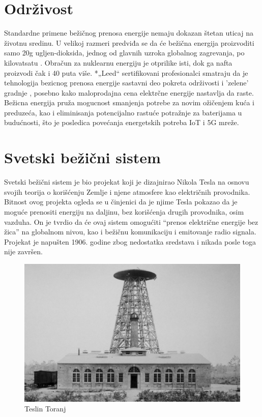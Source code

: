 \documentclass[a4paper]{article}
\begin{document}
\section{Održivost}
\label{sec:Održivost}

Standardne primene bežičnog prenosa energije nemaju dokazan štetan uticaj na životnu sredinu. U velikoj razmeri predviđa se da će bežična energija proizvoditi samo 20g ugljen-dioksida, jednog od glavnih uzroka globalnog zagrevanja, po kilovatsatu \cite{a}. Obračun za nuklearnu energiju je otprilike isti, dok ga nafta proizvodi čak i 40 puta više. *„Leed“ sertifikovani profesionalci smatraju da je tehnologija bezicnog prenosa energije sastavni deo pokreta održivosti i ’zelene’ gradnje \cite{d}, posebno kako maloprodajna cena elektrčne energije nastavlja da raste. Bežicna energija pruža mogucnost smanjenja potrebe za novim ožičenjem kuća i preduzeća, kao i eliminisanja potencijalno rastuće potražnje za baterijama u budućnosti, što je posledica povećanja energetskih potreba IoT i 5G mreže.     


\section{Svetski bežični sistem}
\label{sec:svetskisistem}
Svetski bežični sistem je bio projekat koji je dizajnirao Nikola Tesla na osnovu svojih teorija o korišćenju Zemlje i njene atmosfere kao električnih provodnika. Bitnost ovog projekta ogleda se u činjenici da je njime Tesla pokazao da je moguće prenositi energiju na daljinu, bez korišćenja drugih provodnika, osim vazduha. On je tvrdio da će ovaj sistem omogućiti “prenos električne energije bez žica” na globalnom nivou, kao i bežičnu komunikaciju i emitovanje radio signala. Projekat je napušten 1906. godine zbog nedostatka sredstava i nikada posle toga nije završen.

\begin{figure}[h!]
\begin{center}
\includegraphics[scale=0.25]{toranj.jpg}
\end{center}
\caption{Teslin Toranj}
\label{fig:toranj}
\end{figure}
\end{document}
